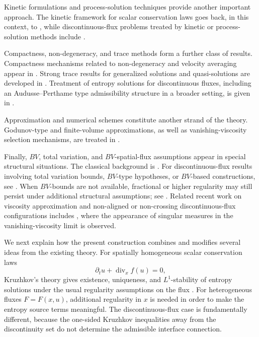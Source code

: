 \documentclass[11pt]{amsart}
\numberwithin{equation}{section}
\theoremstyle{plain}
\theoremstyle{definition}
\theoremstyle{remark}
\begin{document}
Kinetic formulations and process-solution techniques provide another important
approach. The kinetic framework for scalar conservation laws goes back, in
this context, to \cite{LPT94}, while discontinuous-flux problems treated by
kinetic or process-solution methods include
\cite{BachmannVovelle2006,CrastaDCDP2015,CrastaDCDPG2016}.

Compactness, non-degeneracy, and trace methods form a further class of
results. Compactness mechanisms related to non-degeneracy and velocity
averaging appear in
\cite{AleksicMitrovic2009,KarlsenRascleTadmor2007,
Mitrovic2025Nondegenerate,Panov_arma,panov99}.
Strong trace results for generalized solutions and quasi-solutions are
developed in
\cite{pan_traces,PanovTraces2007}.
Treatment of entropy solutions for discontinuous fluxes, including an
Audusse--Perthame type admissibility structure in a broader setting, is given
in \cite{KM-MH,Panov2009,PiccoliTournus2018}.

Approximation and numerical schemes constitute another strand of the theory.
Godunov-type and finite-volume approximations, as well as vanishing-viscosity
selection mechanisms, are treated in
\cite{AdimurthiJNA2004,AKR-NHM,AndreianovDiscConstraint2010,GhoshalJanaTowers2020}.

Finally, \(BV\), total variation, and \(BV\)-spatial-flux assumptions appear
in special structural situations. The classical background is \cite{Volpert1967}.
For discontinuous-flux results involving total variation bounds,
\(BV\)-type hypotheses, or \(BV\)-based constructions, see
\cite{AdimurthiGhoshalGowda2011,GhoshalJanaTowers2020,PiccoliTournus2018}.
When \(BV\)-bounds are not available, fractional or higher regularity may still
persist under additional structural assumptions; see
\cite{GhoshalJuncaParmar2024NARWA,GhoshalJuncaParmar2024SIMA,EKM2}.
Related recent work on viscosity approximation and non-aligned or non-crossing
discontinuous-flux configurations includes
\cite{KarlsenMitrovicNedeljkov2025,Zajmovic2025}, where the appearance of
singular measures in the vanishing-viscosity limit is observed.

We next explain how the present construction combines and modifies several
ideas from the existing theory. For spatially homogeneous scalar conservation
laws
\[
    \partial_t u+\operatorname{div}_x f(u)=0,
\]
Kruzhkov's theory gives existence, uniqueness, and \(L^1\)-stability of entropy
solutions under the usual regularity assumptions on the flux \cite{Kru}. For
heterogeneous fluxes \(F=F(x,u)\), additional regularity in \(x\) is needed in
order to make the entropy source terms meaningful. The discontinuous-flux case
is fundamentally different, because the one-sided Kruzhkov inequalities away
from the discontinuity set do not determine the admissible interface
connection.
\end{document}

